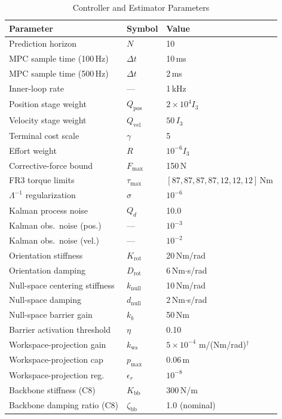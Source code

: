 \documentclass[journal]{IEEEtran}
\begin{document}
\begin{table}[!t]
\caption{Controller and Estimator Parameters}
\label{tab:params}
\renewcommand{\arraystretch}{1.0}
\footnotesize
\setlength{\tabcolsep}{3pt}
\begin{tabular}{p{3.1cm}p{0.9cm}p{2.0cm}}
\toprule
\textbf{Parameter} & \textbf{Symbol} & \textbf{Value}\\
\midrule
Prediction horizon & $N$ & 10\\
MPC sample time (100\,Hz) & $\Delta t$ & 10\,ms\\
MPC sample time (500\,Hz) & $\Delta t$ & 2\,ms\\
Inner-loop rate & --- & 1\,kHz\\
Position stage weight & $Q_\text{pos}$ & $2\times10^4 I_3$\\
Velocity stage weight & $Q_\text{vel}$ & $50\,I_3$\\
Terminal cost scale & $\gamma$ & 5\\
Effort weight & $R$ & $10^{-6}I_3$\\
Corrective-force bound & $F_\text{max}$ & 150\,N\\
FR3 torque limits & $\tau_\text{max}$ & $[87,87,87,87,12,12,12]$\,Nm\\
$\Lambda^{-1}$ regularization & $\sigma$ & $10^{-6}$\\
Kalman process noise & $Q_d$ & 10.0\\
Kalman obs.\ noise (pos.) & --- & $10^{-3}$\\
Kalman obs.\ noise (vel.) & --- & $10^{-2}$\\
Orientation stiffness & $K_\text{rot}$ & 20\,Nm/rad\\
Orientation damping & $D_\text{rot}$ & 6\,Nm$\cdot$s/rad\\
Null-space centering stiffness & $k_\text{null}$ & 10\,Nm/rad\\
Null-space damping & $d_\text{null}$ & 2\,Nm$\cdot$s/rad\\
Null-space barrier gain & $k_b$ & 50\,Nm\\
Barrier activation threshold & $\eta$ & 0.10\\
Workspace-projection gain & $k_\text{ws}$ & $5\times10^{-4}$ m/(Nm/rad)$^\dagger$\\
Workspace-projection cap & $p_\text{max}$ & 0.06\,m\\
Workspace-projection reg. & $\epsilon_r$ & $10^{-8}$\\
Backbone stiffness (C8) & $K_\text{bb}$ & 300\,N/m\\
Backbone damping ratio (C8) & $\zeta_\text{bb}$ & 1.0 (nominal)\\

\end{tabular}
\end{table}
\end{document}

